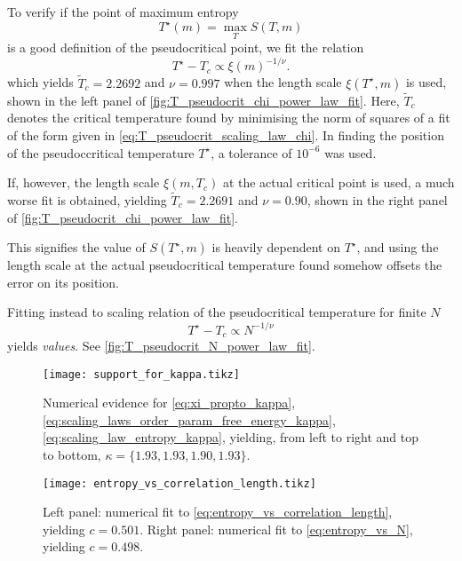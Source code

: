 To verify if the point of maximum entropy
\begin{equation}
  T^{\star}(m) = \max_{T} S(T, m)
\end{equation}
is a good definition of the pseudocritical point, we fit the relation
\begin{equation}\label{eq:T_pseudocrit_scaling_law_chi}
  T^{\star} - T_c \propto \xi(m)^{-1 / \nu}.
\end{equation}
which yields $\widetilde{T}_c = 2.2692$ and $\nu = 0.997$ when the length scale $\xi(T^{\star}, m)$ is used, shown in
the left panel of \autoref{fig:T_pseudocrit_chi_power_law_fit}. Here, $\widetilde{T}_c$ denotes the critical temperature
found by minimising the norm of squares of a fit of the form given in \autoref{eq:T_pseudocrit_scaling_law_chi}. In
finding the position of the pseudoccritical temperature $T^{\star}$, a tolerance of $10^{-6}$ was used.

If, however, the length scale $\xi(m, T_c)$ at the actual critical point is used, a much worse fit is obtained, yielding
$\widetilde{T}_c = 2.2691$ and $\nu = 0.90$, shown in the right panel of
\autoref{fig:T_pseudocrit_chi_power_law_fit}.

This signifies the value of $S(T^{\star}, m)$ is heavily dependent on
$T^{\star}$, and using the length scale at the actual pseudocritical temperature found somehow offsets the error on its
position.

Fitting instead to scaling relation of the pseudocritical temperature for finite $N$
\begin{equation}
  T^{\star} - T_c \propto N^{-1/\nu}
\end{equation}
yields \emph{values}. See \autoref{fig:T_pseudocrit_N_power_law_fit}.




\begin{figure}
  \texttt{[image: support\_for\_kappa.tikz]}
  \caption{Numerical evidence for \autoref{eq:xi_propto_kappa}, \autoref{eq:scaling_laws_order_param_free_energy_kappa},
  \autoref{eq:scaling_law_entropy_kappa}, yielding, from left to right and top to bottom, $\kappa = \{ 1.93, 1.93, 1.90,
  1.93 \}$.}\label{fig:support_for_kappa}
\end{figure}

\begin{figure}
  \texttt{[image: entropy\_vs\_correlation\_length.tikz]}
  \caption{Left panel: numerical fit to \autoref{eq:entropy_vs_correlation_length}, yielding $c = 0.501$. Right panel:
  numerical fit to \autoref{eq:entropy_vs_N}, yielding $c = 0.498$. }\label{fig:entropy_vs_correlation_length}
\end{figure}

